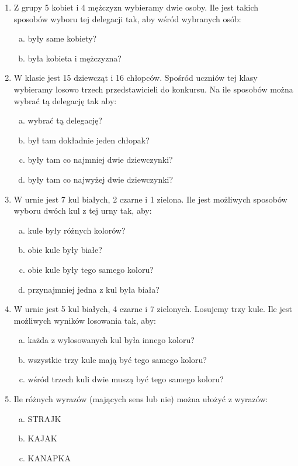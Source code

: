 \documentclass[12pt,a4paper]{article}
\begin{document}
\begin{enumerate}[1.]
\begin{enumerate}[a)]
	\end{enumerate}
\item Z grupy 5 kobiet i 4 mężczyzn wybieramy dwie osoby. Ile jest takich sposobów wyboru tej delegacji tak, aby wśród wybranych osób:
\begin{enumerate}[a)]
	\item były same kobiety?
	\item była kobieta i mężczyzna?
\end{enumerate}
\item W klasie jest 15 dziewcząt i 16 chłopców. Spośród uczniów tej klasy wybieramy losowo trzech przedstawicieli do konkursu. Na ile sposobów można wybrać tą delegację tak aby:
\begin{enumerate}[a)]
	\item wybrać tą delegację?
	\item był tam dokładnie jeden chłopak?
	\item były tam co najmniej dwie dziewczynki?
	\item były tam co najwyżej dwie dziewczynki?
\end{enumerate}
\newpage
\item W urnie jest 7 kul białych, 2 czarne i 1 zielona. Ile jest możliwych sposobów wyboru dwóch kul z tej urny tak, aby:
\begin{enumerate}[a)]
	\item kule były różnych kolorów?
	\item obie kule były białe?
	\item obie kule były tego samego koloru?
	\item przynajmniej jedna z kul była biała?
\end{enumerate}
\item W urnie jest 5 kul białych, 4 czarne i 7 zielonych. Losujemy trzy kule. Ile jest możliwych wyników losowania tak, aby:
\begin{enumerate}[a)]
	\item każda z wylosowanych kul była innego koloru?
	\item wszystkie trzy kule mają być tego samego koloru?
	\item wśród trzech kuli dwie muszą być tego samego koloru?
\end{enumerate}
\item Ile różnych wyrazów (mających sens lub nie) można ułożyć z wyrazów:
\begin{enumerate}[a)]
	\item STRAJK
	\item KAJAK
	\item KANAPKA

\end{enumerate}
\end{enumerate}
\end{document}

